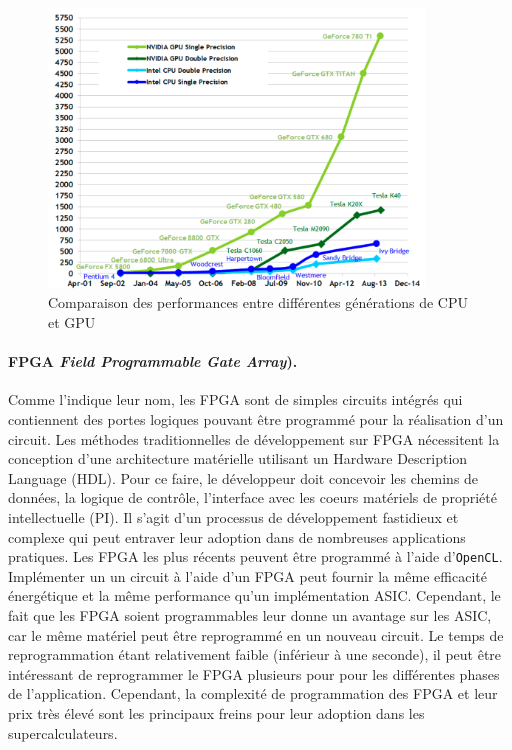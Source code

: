             \begin{figure}
            \center
            \includegraphics[width=10cm]{images/CPUvsGPU.png}
            \caption{\label{fig:CPUvsGPU} Comparaison des performances entre différentes générations de CPU et GPU}
        \end{figure}
            

        \paragraph{FPGA \textit{Field Programmable Gate Array}).}  Comme l'indique leur nom, les FPGA sont de simples circuits intégrés qui contiennent des portes logiques pouvant être programmé pour la réalisation d'un circuit. 
        Les méthodes traditionnelles de développement sur FPGA nécessitent la conception d'une architecture matérielle utilisant un Hardware Description Language (HDL). Pour ce faire, le développeur doit concevoir les chemins de données, la logique de contrôle, l'interface avec les coeurs matériels de propriété intellectuelle (PI). Il s'agit d'un processus de développement fastidieux et complexe qui peut entraver leur adoption dans de nombreuses applications pratiques. Les FPGA les plus récents peuvent être programmé à l'aide d'\verb|OpenCL|.
        Implémenter un un circuit à l'aide d'un FPGA peut fournir la même efficacité énergétique et la même performance qu'un implémentation ASIC. Cependant, le fait que les FPGA soient programmables leur donne un avantage sur les ASIC, car le même matériel peut être reprogrammé en un nouveau circuit. Le temps de reprogrammation étant relativement faible (inférieur à une seconde), il peut être intéressant de reprogrammer le FPGA plusieurs pour pour les différentes phases de l'application. Cependant, la complexité de programmation des FPGA et leur prix très élevé sont les principaux freins pour leur adoption dans les supercalculateurs.        


